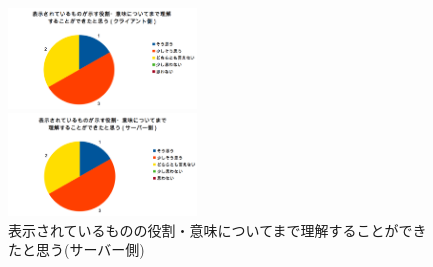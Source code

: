 \documentclass{funthesis}
\begin{document}
\begin{figure}[H]
 \begin{minipage}{0.5\hsize}
  \begin{center}
  \includegraphics[width=50mm]{./img/question3.png}
  \end{center}
  \caption{表示されているものの役割・意味\newline についてまで理解することができた\newline と思う(クライアント側)}
  \label{question3}
 \end{minipage}
 \begin{minipage}{0.5\hsize}
  \begin{center}
  \includegraphics[width=50mm]{./img/question4.png}
  \end{center}
  \caption{表示されているものの役割・意味\newline についてまで理解することができた\newline と思う(サーバー側)}
  \label{question4}
  \end{minipage}
  \end{figure}
  
\end{document}
